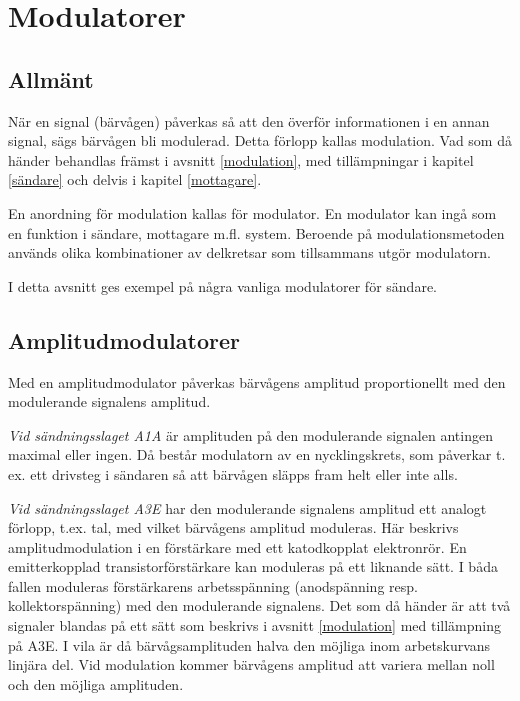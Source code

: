 \section{Modulatorer}

\subsection{Allmänt}

När en signal (bärvågen) påverkas så att den överför informationen i
en annan signal, sägs bärvågen bli modulerad. Detta förlopp kallas
modulation. Vad som då händer behandlas främst i avsnitt
\ref{modulation}, med tillämpningar i kapitel \ref{sändare} och delvis i
kapitel \ref{mottagare}.

En anordning för modulation kallas för modulator. En modulator kan
ingå som en funktion i sändare, mottagare m.fl. system.  Beroende på
modulationsmetoden används olika kombinationer av delkretsar som
tillsammans utgör modulatorn.

I detta avsnitt ges exempel på några vanliga modulatorer för sändare.

\subsection{Amplitudmodulatorer}

Med en amplitudmodulator påverkas bärvågens amplitud proportionellt
med den modulerande signalens amplitud.

\emph{Vid sändningsslaget A1A} är amplituden på den modulerande
signalen antingen maximal eller ingen. Då består modulatorn av en
nycklingskrets, som påverkar t. ex. ett drivsteg i sändaren så att
bärvågen släpps fram helt eller inte alls.

\emph{Vid sändningsslaget A3E} har den modulerande signalens amplitud
ett analogt förlopp, t.ex. tal, med vilket bärvågens amplitud
moduleras. Här beskrivs amplitudmodulation i en förstärkare med ett
katodkopplat elektronrör. En emitterkopplad transistorförstärkare kan
moduleras på ett liknande sätt. I båda fallen moduleras förstärkarens
arbetsspänning (anodspänning resp. kollektorspänning) med den
modulerande signalens. Det som då händer är att två signaler blandas
på ett sätt som beskrivs i avsnitt \ref{modulation} med tillämpning på A3E.
I vila är då bärvågsamplituden halva den möjliga inom arbetskurvans linjära
del. Vid modulation kommer bärvågens amplitud att variera mellan noll
och den möjliga amplituden.

